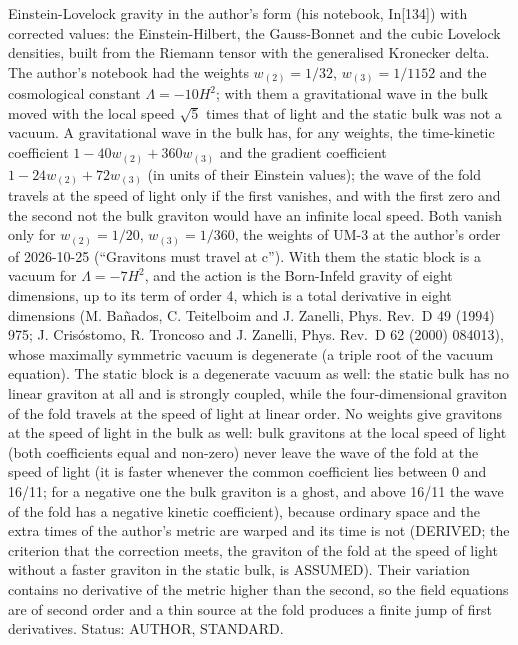 \documentclass[
  10pt,
]{article}
\begin{document}
Einstein-Lovelock gravity in the author's form (his notebook,
In{[}134{]}) with corrected values: the Einstein-Hilbert, the
Gauss-Bonnet and the cubic Lovelock densities, built from the Riemann
tensor with the generalised Kronecker delta. The author's notebook had
the weights \(w_{(2)} = 1/32\), \(w_{(3)} = 1/1152\) and the
cosmological constant \(\Lambda = -10H^2\); with them a gravitational
wave in the bulk moved with the local speed \(\sqrt5\) times that of
light and the static bulk was not a vacuum. A gravitational wave in the
bulk has, for any weights, the time-kinetic coefficient
\(1 - 40w_{(2)} + 360w_{(3)}\) and the gradient coefficient
\(1 - 24w_{(2)} + 72w_{(3)}\) (in units of their Einstein values); the
wave of the fold travels at the speed of light only if the first
vanishes, and with the first zero and the second not the bulk graviton
would have an infinite local speed. Both vanish only for
\(w_{(2)} = 1/20\), \(w_{(3)} = 1/360\), the weights of UM-3 at the
author's order of 2026-10-25 (``Gravitons must travel at c''). With them
the static block is a vacuum for \(\Lambda = -7H^2\), and the action is
the Born-Infeld gravity of eight dimensions, up to its term of order 4,
which is a total derivative in eight dimensions (M. Bañados, C.
Teitelboim and J. Zanelli, Phys. Rev.~D 49 (1994) 975; J. Crisóstomo, R.
Troncoso and J. Zanelli, Phys. Rev.~D 62 (2000) 084013), whose maximally
symmetric vacuum is degenerate (a triple root of the vacuum equation).
The static block is a degenerate vacuum as well: the static bulk has no
linear graviton at all and is strongly coupled, while the
four-dimensional graviton of the fold travels at the speed of light at
linear order. No weights give gravitons at the speed of light in the
bulk as well: bulk gravitons at the local speed of light (both
coefficients equal and non-zero) never leave the wave of the fold at the
speed of light (it is faster whenever the common coefficient lies
between 0 and 16/11; for a negative one the bulk graviton is a ghost,
and above 16/11 the wave of the fold has a negative kinetic
coefficient), because ordinary space and the extra times of the author's
metric are warped and its time is not (DERIVED; the criterion that the
correction meets, the graviton of the fold at the speed of light without
a faster graviton in the static bulk, is ASSUMED). Their variation
contains no derivative of the metric higher than the second, so the
field equations are of second order and a thin source at the fold
produces a finite jump of first derivatives. Status: AUTHOR, STANDARD.
\end{document}
